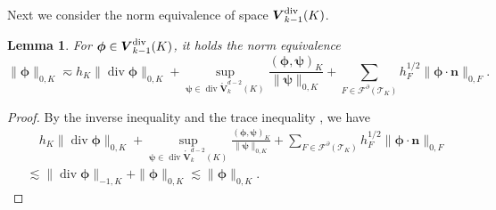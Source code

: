 \documentclass[10pt]{amsart}
\newtheorem{lemma}[theorem]{Lemma}
\renewcommand{\div}{\operatorname{div}}
\numberwithin{equation}{section}
\begin{document}
Next we consider the norm equivalence of space $\boldsymbol{V}_{k-1}^{\rm div}(K)$.


\begin{lemma}\label{lem:Vkm1divnormequivalence}
For $\boldsymbol{\phi}\in\boldsymbol{V}_{k-1}^{\rm div}(K)$, it holds the norm equivalence
\begin{equation}\label{eq:Vkm1divnormequivalence}
\|\boldsymbol{\phi}\|_{0,K}\eqsim h_K\|\div\boldsymbol{\phi}\|_{0,K} + \sup_{\boldsymbol{\psi}\in\div\mathring{\boldsymbol{V}}_{k}^{d-2}(K)}\frac{(\boldsymbol{\phi}, \boldsymbol{\psi})_K}{\|\boldsymbol{\psi}\|_{0,K}} +\sum_{F\in\mathcal F^{\partial}(\mathcal T_K)}h_F^{1/2}\|\boldsymbol{\phi}\cdot\boldsymbol{n}\|_{0,F}.
\end{equation}
\end{lemma}
\begin{proof}
By the inverse inequality \cite[Lemma 10]{Huang2020} and the trace inequality \cite[(2.18)]{BrennerSung2018}, we have
\begin{align*}
&\quad h_K\|\div\boldsymbol{\phi}\|_{0,K}+\sup_{\boldsymbol{\psi}\in\div\mathring{\boldsymbol{V}}_{k}^{d-2}(K)}\frac{(\boldsymbol{\phi}, \boldsymbol{\psi})_K}{\|\boldsymbol{\psi}\|_{0,K}} +\sum_{F\in\mathcal F^{\partial}(\mathcal T_K)}h_F^{1/2}\|\boldsymbol{\phi}\cdot\boldsymbol{n}\|_{0,F}\\
&\lesssim \|\div\boldsymbol{\phi}\|_{-1,K} + \|\boldsymbol{\phi}\|_{0,K} \lesssim \|\boldsymbol{\phi}\|_{0,K}.    
\end{align*}


\end{proof}
\end{document}
